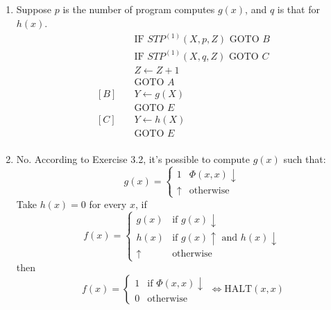 \subsection{}
\begin{enumerate}
  \item 
  Suppose $p$ is the number of program computes $g(x)$, and $q$ is
  that for $h(x)$.
  \begin{align*}
    [A]\quad & \text{IF } STP^{(1)}(X,p,Z) \text{ GOTO } B \\
         & \text{IF } STP^{(1)}(X,q,Z) \text{ GOTO } C \\
         & Z \gets Z + 1 \\
         & \text{GOTO } A \\
    [B]\quad & Y \gets g(X) \\
         & \text{GOTO } E \\
    [C]\quad & Y \gets h(X) \\
         & \text{GOTO } E \\
  \end{align*}
  
  \item 
  No. According to Exercise 3.2, it's possible to compute $g(x)$ such that:
  \[ g(x) = 
     \begin{cases}
       1        & \Phi(x,x) \downarrow \\
       \uparrow & \text{otherwise}
     \end{cases} \]
  Take $ h(x) = 0 $ for every $x$, if
  \[ f(x) =
     \begin{cases}
       g(x)    & \text{if } g(x) \downarrow \\
       h(x)     & \text{if } g(x) \uparrow \text{ and } h(x) \downarrow \\
       \uparrow & \text{otherwise}
     \end{cases} \]
  then
  \[ f(x) = 
     \begin{cases}
       1 & \text{if } \Phi(x,x) \downarrow \\
       0 & \text{otherwise}
     \end{cases}
     \Leftrightarrow \mathrm{HALT}(x,x) \]
\end{enumerate}


